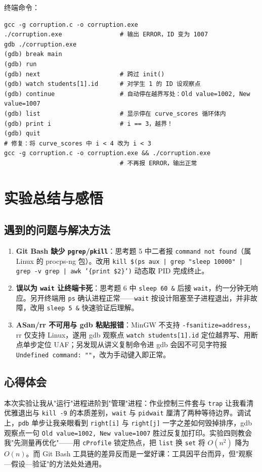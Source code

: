 \documentclass[12pt,a4paper]{article}
\begin{document}
终端命令：
\begin{lstlisting}
gcc -g corruption.c -o corruption.exe
./corruption.exe                # 输出 ERROR，ID 变为 1007
gdb ./corruption.exe
(gdb) break main
(gdb) run
(gdb) next                      # 跨过 init()
(gdb) watch students[1].id      # 对学生 1 的 ID 设观察点
(gdb) continue                  # 自动停在越界写处：Old value=1002, New value=1007
(gdb) list                      # 显示停在 curve_scores 循环体内
(gdb) print i                   # i == 3，越界！
(gdb) quit
# 修复：将 curve_scores 中 i < 4 改为 i < 3
gcc -g corruption.c -o corruption.exe && ./corruption.exe
                                # 不再报 ERROR，输出正常
\end{lstlisting}
\newpage
\section{实验总结与感悟}

\subsection{遇到的问题与解决方法}
\begin{enumerate}
    \item \textbf{Git Bash 缺少 \texttt{pgrep}/\texttt{pkill}}：思考题 5 中二者报 \texttt{command not found}（属 Linux 的 procps-ng 包）。改用 \texttt{kill \$(ps aux | grep "sleep 10000" | grep -v grep | awk '\{print \$2\}')} 动态取 PID 完成终止。
    \item \textbf{误以为 \texttt{wait} 让终端卡死}：思考题 6 中 \texttt{sleep 60 \&} 后接 \texttt{wait}，约一分钟无响应。另开终端用 \texttt{ps} 确认进程正常——\texttt{wait} 按设计阻塞至子进程退出，并非故障，改用 \texttt{sleep 5 \&} 快速验证后理解。
    \item \textbf{ASan/rr 不可用与 gdb 粘贴报错}：MinGW 不支持 \texttt{-fsanitize=address}，rr 仅支持 Linux，遂用 gdb 观察点 \texttt{watch students[1].id} 定位越界写、用断点单步定位 UAF；另发现从讲义复制命令进 gdb 会因不可见字符报 \texttt{Undefined command: ""}，改为手动键入即正常。
\end{enumerate}

\subsection{心得体会}
本次实验让我从"运行"进程进阶到"管理"进程：作业控制三件套与 \texttt{trap} 让我看清优雅退出与 \texttt{kill -9} 的本质差别，\texttt{wait} 与 \texttt{pidwait} 厘清了两种等待边界。调试上，\texttt{pdb} 单步让我亲眼看到 \texttt{right[i]} 与 \texttt{right[j]} 一字之差如何毁掉排序，gdb 观察点一句 \texttt{Old value=1002, New value=1007} 胜过反复加打印。实验四则教会我"先测量再优化"——用 \texttt{cProfile} 锁定热点，把 \texttt{list} 换 \texttt{set} 将 $O(n^2)$ 降为 $O(n)$。而 Git Bash 工具链的差异反而是一堂好课：工具因平台而异，但"观察—假设—验证"的方法处处通用。
\end{document}
